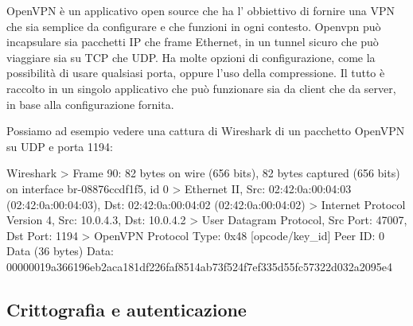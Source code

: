 



OpenVPN è un applicativo open source che ha l' obbiettivo di fornire una VPN che sia semplice da configurare e che funzioni in ogni contesto. Openvpn può incapsulare sia pacchetti IP che frame Ethernet, in un tunnel sicuro che può viaggiare sia su TCP che UDP. Ha molte opzioni di configurazione, come la possibilità di usare qualsiasi porta, oppure l'uso della compressione. Il tutto è raccolto in un singolo applicativo che può funzionare sia da client che da server, in base alla configurazione fornita.

Possiamo ad esempio vedere una cattura di Wireshark di un pacchetto OpenVPN su UDP e porta 1194:

\begin{bashcode}{Wireshark}{}
> Frame 90: 82 bytes on wire (656 bits), 82 bytes captured (656 bits) on interface br-08876ccdf1f5, id 0
> Ethernet II, Src: 02:42:0a:00:04:03 (02:42:0a:00:04:03), Dst: 02:42:0a:00:04:02 (02:42:0a:00:04:02)
> Internet Protocol Version 4, Src: 10.0.4.3, Dst: 10.0.4.2
> User Datagram Protocol, Src Port: 47007, Dst Port: 1194
> OpenVPN Protocol
        Type: 0x48 [opcode/key_id]
        Peer ID: 0
        Data (36 bytes)
            Data: 00000019a366196eb2aca181df226faf8514ab73f524f7ef335d55fc57322d032a2095e4
\end{bashcode}

\subsection{Crittografia e autenticazione}
\label{subsec:auth}

